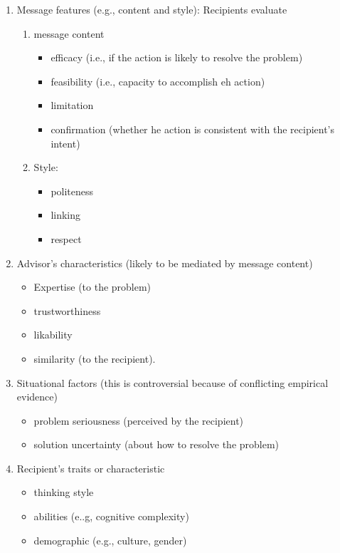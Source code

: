 \documentclass[
]{book}
\providecommand{\tightlist}{%
  \setlength{\itemsep}{0pt}\setlength{\parskip}{0pt}}
\begin{document}
\begin{enumerate}
\def\labelenumi{\arabic{enumi}.}
\item
  Message features (e.g., content and style): Recipients evaluate

  \begin{enumerate}
  \def\labelenumii{\arabic{enumii}.}
  \item
    message content

    \begin{itemize}
    \tightlist
    \item
      efficacy (i.e., if the action is likely to resolve the problem)
    \item
      feasibility (i.e., capacity to accomplish eh action)
    \item
      limitation
    \item
      confirmation (whether he action is consistent with the recipient's intent)
    \end{itemize}
  \item
    Style:

    \begin{itemize}
    \tightlist
    \item
      politeness
    \item
      linking
    \item
      respect
    \end{itemize}
  \end{enumerate}
\item
  Advisor's characteristics (likely to be mediated by message content)

  \begin{itemize}
  \tightlist
  \item
    Expertise (to the problem)
  \item
    trustworthiness
  \item
    likability
  \item
    similarity (to the recipient).
  \end{itemize}
\item
  Situational factors (this is controversial because of conflicting empirical evidence)

  \begin{itemize}
  \tightlist
  \item
    problem seriousness (perceived by the recipient)
  \item
    solution uncertainty (about how to resolve the problem)
  \end{itemize}
\item
  Recipient's traits or characteristic

  \begin{itemize}
  \tightlist
  \item
    thinking style
  \item
    abilities (e..g, cognitive complexity)
  \item
    demographic (e.g., culture, gender)
  \end{itemize}
\end{enumerate}
\end{document}
